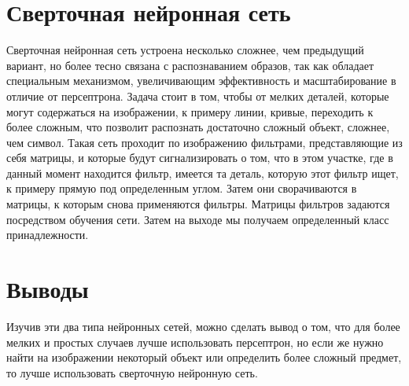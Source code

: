 \section{Сверточная нейронная сеть} \label{ch4:sec2}

Сверточная нейронная сеть устроена несколько сложнее, чем предыдущий вариант, но более тесно связана с распознаванием образов, так как обладает специальным механизмом, увеличивающим эффективность и масштабирование в отличие от персептрона. Задача стоит в том, чтобы от мелких деталей, которые могут содержаться на изображении, к примеру линии, кривые, переходить к более сложным, что позволит распознать достаточно сложный объект, сложнее, чем символ. Такая сеть проходит по изображению фильтрами, представляющие из себя матрицы, и которые будут сигнализировать о том, что в этом участке, где в данный момент находится фильтр, имеется та деталь, которую этот фильтр ищет, к примеру прямую под определенным углом. Затем они сворачиваются в матрицы, к которым снова применяются фильтры. Матрицы фильтров задаются посредством обучения сети. Затем на выходе мы получаем определенный класс принадлежности. \cite{neiron2}


\section{Выводы} \label{ch4:conclusion}

Изучив эти два типа нейронных сетей, можно сделать вывод о том, что для более мелких и простых случаев лучше использовать персептрон, но если же нужно найти на изображении некоторый объект или определить более сложный предмет, то лучше использовать сверточную нейронную сеть. 

%
